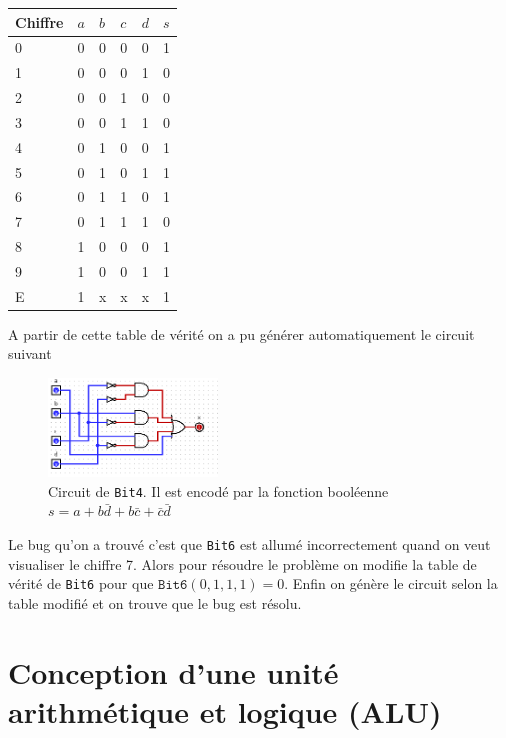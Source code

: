 \documentclass[10pt]{article} %
\begin{document}
\begin{table}[h!]
    \hspace{2cm}
    \begin{tabular}{l|llll|l}
    Chiffre & $a$ & $b$ & $c$ & $d$ & $s$ \\
    \hline
    0       & 0 & 0 & 0 & 0 & 1 \\
    1       & 0 & 0 & 0 & 1 & 0 \\
    2       & 0 & 0 & 1 & 0 & 0 \\
    3       & 0 & 0 & 1 & 1 & 0 \\
    4       & 0 & 1 & 0 & 0 & 1 \\
    5       & 0 & 1 & 0 & 1 & 1 \\
    6       & 0 & 1 & 1 & 0 & 1 \\
    7       & 0 & 1 & 1 & 1 & 0 \\
    8       & 1 & 0 & 0 & 0 & 1 \\
    9       & 1 & 0 & 0 & 1 & 1 \\
    E       & 1 & x & x & x & 1
    \end{tabular}
    \end{table}

    A partir de cette table de vérité on a pu générer automatiquement le circuit suivant

    \begin{figure}[h!]
        \centering
        \includegraphics[width=0.4\textwidth]{media/bit4.png}
        \caption{Circuit de \texttt{Bit4}. Il est encodé par la fonction booléenne $s = a + b\bar d + b\bar c + \bar c \bar d$}
    \end{figure}

    Le bug qu'on a trouvé c'est que \texttt{Bit6} est allumé incorrectement quand on veut visualiser le chiffre 7. Alors pour résoudre le problème
    on modifie la table de vérité de \texttt{Bit6} pour que $\texttt{Bit6}(0,1,1,1) = 0$. Enfin on génère le circuit selon la table modifié et on
    trouve que le bug est résolu.

\section{Conception d'une unité arithmétique et logique (ALU)}
\end{document}
